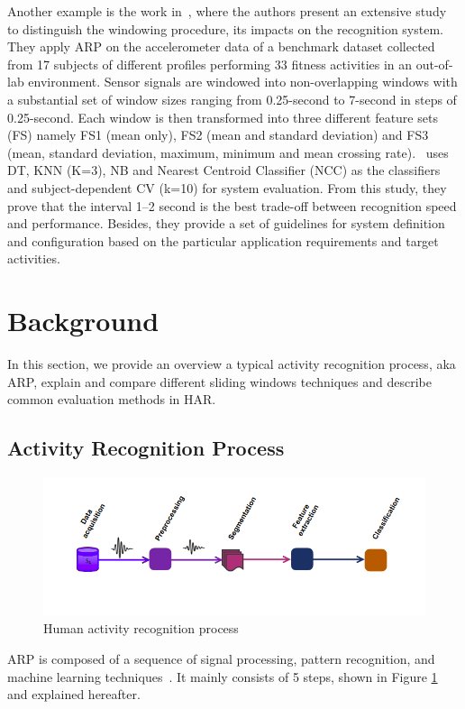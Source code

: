 \documentclass[sensors,article,submit,moreauthors,pdftex]{Definitions/mdpi}
\begin{document}
Another example is the work in~\cite{banos2014window}, where the authors present an extensive study to distinguish the windowing procedure, its impacts on the recognition system. They apply ARP on the accelerometer data of a benchmark dataset collected from 17 subjects of different profiles performing 33 fitness activities in an out-of-lab environment. Sensor signals are windowed into non-overlapping windows with a substantial set of window sizes ranging from 0.25-second to 7-second in steps of 0.25-second. Each window is then transformed into three different feature sets (FS) namely FS1 (mean only), FS2 (mean and standard deviation) and FS3 (mean, standard deviation, maximum, minimum and mean crossing rate).~\cite{banos2014window} uses DT, KNN (K=3), NB and Nearest Centroid Classifier (NCC) as the classifiers and subject-dependent CV (k=10) for system evaluation. From this study, they prove that the interval 1–2 second is the best trade-off between recognition speed and performance. Besides, they provide a set of guidelines for system definition and configuration based on the particular application requirements and target activities. 

\section{Background}\label{sec:background}
In this section, we provide an overview a typical activity recognition process, aka ARP, explain and compare different sliding windows techniques and describe common evaluation methods in HAR.
\subsection{Activity Recognition Process}\label{subsec:ARP}

\begin{figure}[ht]
    \centering
    \includegraphics[width=.6\textwidth]{Figures/HARP.png}
    \caption{Human activity recognition process}
    \label{fig:tsprocess}
\end{figure}

ARP is composed of a sequence of signal processing, pattern recognition, and 
machine learning techniques~\cite{bulling2014tutorial}. It mainly 
consists of 5 steps, shown in Figure \ref{fig:tsprocess} and 
explained hereafter.
\end{document}
